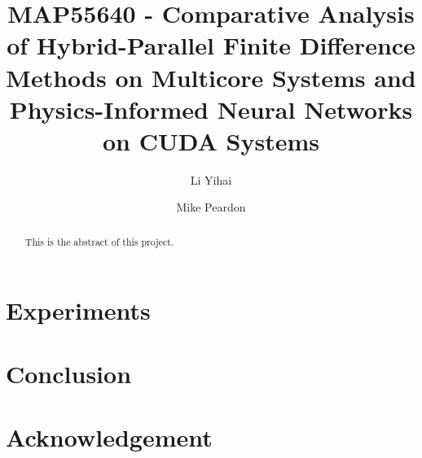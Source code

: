 \documentclass[manuscript, screen, review, language=english, natbib=false]{acmart}
\begin{document}
\title[Final Project]{MAP55640 - 
Comparative Analysis of Hybrid-Parallel Finite Difference Methods on Multicore Systems 
and 
Physics-Informed Neural Networks on CUDA Systems}


\author{Li Yihai}

\author{Mike Peardon}




\begin{abstract}
  This is the abstract of this project.

  \lipsum[2-4]
\end{abstract}
    

\maketitle







\section{Experiments}
\section{Conclusion}
\section{Acknowledgement}



% 
% 

\printbibliography

\appendix
\end{document}
